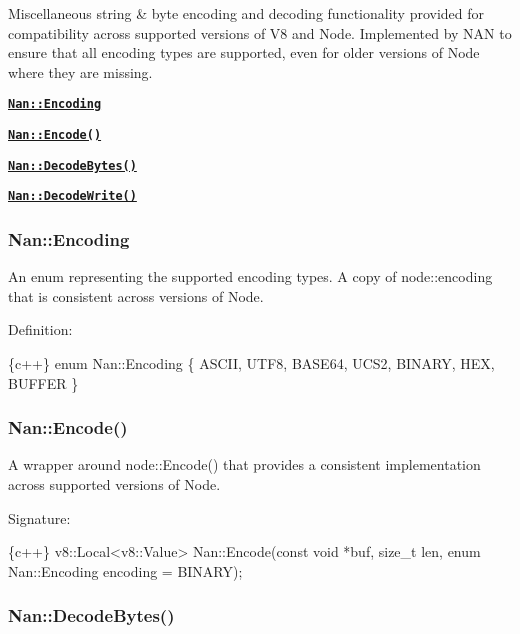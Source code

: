 Miscellaneous string \& byte encoding and decoding functionality provided for compatibility across supported versions of V8 and Node. Implemented by N\+AN to ensure that all encoding types are supported, even for older versions of Node where they are missing.


\begin{DoxyItemize}
\item \href{#api_nan_encoding}{\tt {\bfseries {\ttfamily Nan\+::\+Encoding}}}
\item \href{#api_nan_encode}{\tt {\bfseries {\ttfamily Nan\+::\+Encode()}}}
\item \href{#api_nan_decode_bytes}{\tt {\bfseries {\ttfamily Nan\+::\+Decode\+Bytes()}}}
\item \href{#api_nan_decode_write}{\tt {\bfseries {\ttfamily Nan\+::\+Decode\+Write()}}}
\end{DoxyItemize}

\label{_api_nan_encoding}%
 \subsubsection*{Nan\+::\+Encoding}

An enum representing the supported encoding types. A copy of {\ttfamily node\+::encoding} that is consistent across versions of Node.

Definition\+:


\begin{DoxyCode}
\{c++\}
enum Nan::Encoding \{ ASCII, UTF8, BASE64, UCS2, BINARY, HEX, BUFFER \}
\end{DoxyCode}


\label{_api_nan_encode}%
 \subsubsection*{Nan\+::\+Encode()}

A wrapper around {\ttfamily node\+::\+Encode()} that provides a consistent implementation across supported versions of Node.

Signature\+:


\begin{DoxyCode}
\{c++\}
v8::Local<v8::Value> Nan::Encode(const void *buf,
                                 size\_t len,
                                 enum Nan::Encoding encoding = BINARY);
\end{DoxyCode}


\label{_api_nan_decode_bytes}%
 \subsubsection*{Nan\+::\+Decode\+Bytes()}

